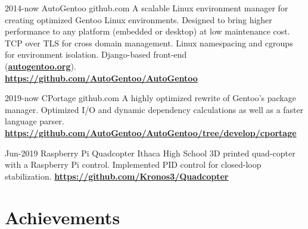 \documentclass[print]{alternate}
\begin{document}
\begin{entrylist}
\entry
{2014-now}
{AutoGentoo }
{github.com}
{A scalable Linux environment manager for creating optimized Gentoo Linux environments. Designed to bring higher performance to any platform (embedded or desktop) at low maintenance cost. TCP over TLS for cross domain management. Linux namespacing and cgroups for environment isolation. Django-based front-end \\ (\textbf{\href{https://autogentoo.org}{autogentoo.org}}).\\
\textbf{\href{https://github.com/AutoGentoo/AutoGentoo}{https://github.com/AutoGentoo/AutoGentoo}}
}

\entry
{2019-now}
{CPortage}
{github.com}
{A highly optimized rewrite of Gentoo's package manager. Optimized I/O and dynamic dependency calculations as well as a faster language parser. \\\textbf{\href{https://github.com/AutoGentoo/AutoGentoo/tree/develop/cportage}{https://github.com/AutoGentoo/AutoGentoo/tree/develop/cportage}}
}

\entry
{Jun-2019}
{Raspberry Pi Quadcopter }
{Ithaca High School}
{3D printed quad-copter with a Raspberry Pi control. Implemented PID control for closed-loop stabilization. \textbf{\href{https://github.com/Kronos3/Quadcopter}{https://github.com/Kronos3/Quadcopter}} }
{\vspace{-0.3cm}}
\end{entrylist}

\pagebreak
\section{Achievements}
\end{document}
